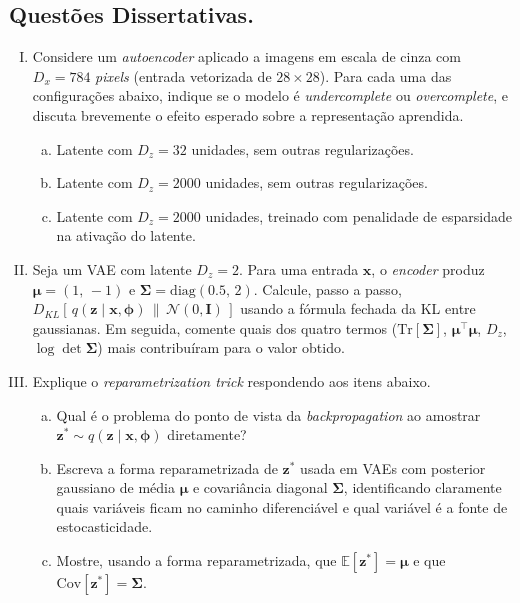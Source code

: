 \documentclass{dlproblemset}
\begin{document}
\color{black}

\newpage

\subsection*{Questões Dissertativas.}

\begin{enumerate}[I)]

    \item Considere um \textit{autoencoder} aplicado a imagens em escala de cinza com $D_x = 784$ \textit{pixels} (entrada vetorizada de $28 \times 28$). Para cada uma das configurações abaixo, indique se o modelo é \emph{undercomplete} ou \emph{overcomplete}, e discuta brevemente o efeito esperado sobre a representação aprendida.
    \begin{enumerate}[(a)]
        \item Latente com $D_z = 32$ unidades, sem outras regularizações.
        \item Latente com $D_z = 2000$ unidades, sem outras regularizações.
        \item Latente com $D_z = 2000$ unidades, treinado com penalidade de esparsidade na ativação do latente.
    \end{enumerate}

    \item Seja um VAE com latente $D_z = 2$. Para uma entrada $\mathbf{x}$, o \textit{encoder} produz $\boldsymbol{\mu} = (1,\, -1)$ e $\boldsymbol{\Sigma} = \mathrm{diag}(0.5,\, 2)$. Calcule, passo a passo, $D_{KL}\!\left[\,q(\mathbf{z} \mid \mathbf{x}, \boldsymbol{\phi})\,\|\,\mathcal{N}(0, \mathbf{I})\,\right]$ usando a fórmula fechada da KL entre gaussianas. Em seguida, comente quais dos quatro termos ($\mathrm{Tr}[\boldsymbol{\Sigma}]$, $\boldsymbol{\mu}^{\top}\boldsymbol{\mu}$, $D_z$, $\log\det\boldsymbol{\Sigma}$) mais contribuíram para o valor obtido.

    \item Explique o \textit{reparametrization trick} respondendo aos itens abaixo.
    \begin{enumerate}[(a)]
        \item Qual é o problema do ponto de vista da \textit{backpropagation} ao amostrar $\mathbf{z}^{*} \sim q(\mathbf{z} \mid \mathbf{x}, \boldsymbol{\phi})$ diretamente?
        \item Escreva a forma reparametrizada de $\mathbf{z}^{*}$ usada em VAEs com posterior gaussiano de média $\boldsymbol{\mu}$ e covariância diagonal $\boldsymbol{\Sigma}$, identificando claramente quais variáveis ficam no caminho diferenciável e qual variável é a fonte de estocasticidade.
        \item {} Mostre, usando a forma reparametrizada, que $\mathbb{E}[\mathbf{z}^{*}] = \boldsymbol{\mu}$ e que $\mathrm{Cov}[\mathbf{z}^{*}] = \boldsymbol{\Sigma}$.
    \end{enumerate}


\end{enumerate}
\end{document}
